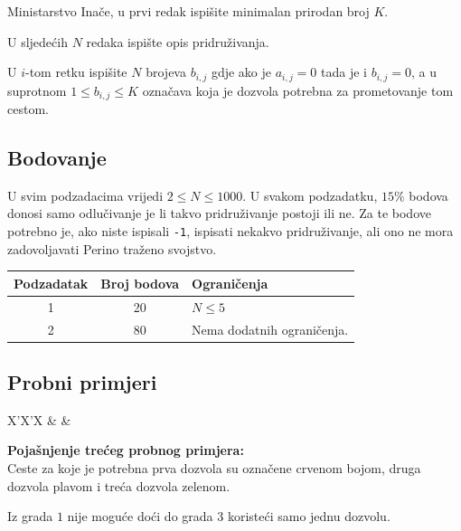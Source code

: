 \begin{statement}[
  problempoints=100,
  timelimit=1 sekunda,
  memorylimit=1024 MiB,
]{Ministarstvo}
Inače, u prvi redak ispišite minimalan prirodan broj $K$.

U sljedećih $N$ redaka ispište opis pridruživanja.

U $i$-tom retku ispišite $N$ brojeva $b_{i, j}$ gdje ako je $a_{i, j} = 0$ tada je i $b_{i, j} = 0$, a u suprotnom $1 \leq b_{i, j} \leq K$ označava koja je dozvola potrebna za prometovanje tom cestom. 

\subsection*{Bodovanje}

U svim podzadacima vrijedi $2 \leq N \leq 1000$. U svakom podzadatku, $15\%$ bodova donosi samo odlučivanje je li takvo pridruživanje postoji ili ne. Za te bodove potrebno je, ako niste ispisali \texttt{-1}, ispisati nekakvo pridruživanje, ali ono ne mora zadovoljavati Perino traženo svojstvo. 

{\renewcommand{\arraystretch}{1.4}
  \setlength{\tabcolsep}{6pt}
  \begin{tabular}{ccl}
   Podzadatak & Broj bodova & Ograničenja \\ \midrule
    1 & 20 & $N \leq 5$  \\
    2 & 80 & Nema dodatnih ograničenja. \\
\end{tabular}}

\subsection*{Probni primjeri}
\begin{tabularx}{\textwidth}{X'X'X}
 &
 &
\end{tabularx}

\textbf{Pojašnjenje trećeg probnog primjera:}\\

Ceste za koje je potrebna prva dozvola su označene crvenom bojom, druga dozvola plavom i treća dozvola zelenom. 

Iz grada $1$ nije moguće doći do grada $3$ koristeći samo jednu dozvolu.


\end{statement}
